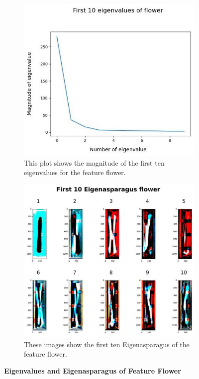 \begin{figure}[!h]
	\centering
	\begin{subfigure}{0.7\textwidth}
		\includegraphics[width=0.9\linewidth]{Figures/chapter04/pca_flower_graph.png} 
		\caption{This plot shows the magnitude of the first ten eigenvalues for the feature flower.}
	\end{subfigure}
	\vspace{20pt}
	
	\begin{subfigure}{0.9\textwidth}
		\includegraphics[width=0.9\linewidth]{Figures/chapter04/pca_flower.png}
		\caption{These images show the first ten Eigenasparagus of the feature flower.}
	\end{subfigure}
    \caption[First Ten Eigenvalues and Eigenasparagus of Feature Flower]{\textbf{Eigenvalues and Eigenasparagus of Feature Flower}}
    \label{fig:PCAflower}
\end{figure}


